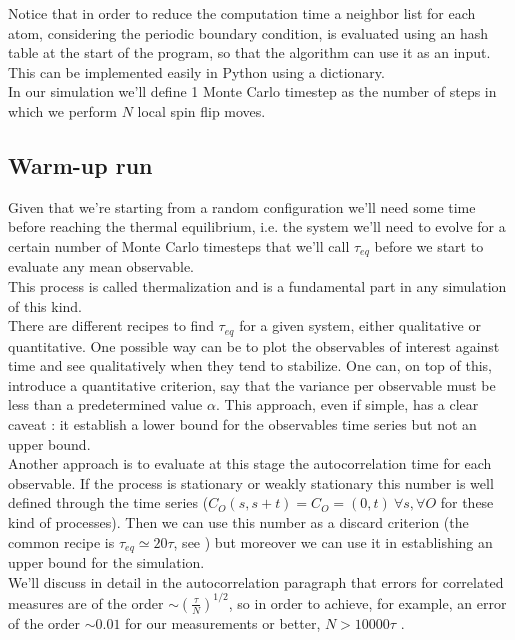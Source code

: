 Notice that in order to reduce the computation time a neighbor list for each atom, considering the periodic boundary condition, 
is evaluated using an hash table at the start of the program, so that the algorithm can use it as an input. This can be implemented
 easily in Python using a dictionary. \\
In our simulation we'll define 1 Monte Carlo timestep as the number of steps in which we perform $N$ local spin flip moves. \\

\subsection{Warm-up run} 
Given that we're starting from a random configuration we'll need some time before reaching the thermal equilibrium, 
i.e. the system we'll need to evolve for a certain number of Monte Carlo timesteps that we'll call $\tau_{eq}$ before we start to evaluate any mean observable. \\
This process is called thermalization and is a fundamental part in any simulation of this kind. \\
There are different recipes to find $\tau_{eq}$ for a given system, either qualitative or quantitative. One possible way can be to plot the
observables of interest against time and see qualitatively when they tend to stabilize. One can, on top of this, introduce a quantitative criterion,
say that the variance per observable must be less than a predetermined value $\alpha$. This approach, even if simple, has a clear caveat : it establish a lower
bound for the observables time series but not an upper bound. \\
Another approach is to evaluate at this stage the autocorrelation time for each observable. If the process is stationary or weakly stationary this number is 
well defined through the time series ($C_O(s, s+t) = C_O=(0, t)\ \forall s, \forall O$ for these kind of processes). Then we can use this number as a discard criterion 
(the common recipe is $\tau_{eq} \simeq 20 \tau$, see \cite{Sokal1997}) but moreover we can use it in establishing an upper bound for the simulation. \\
We'll discuss in detail in the autocorrelation paragraph that errors for correlated measures are of the order $\sim (\frac{\tau}{N})^{1/2}$, so in order to 
achieve, for example, an error of the order $ \sim 0.01$ for our measurements or better, $N > 10000\tau$ . \\

